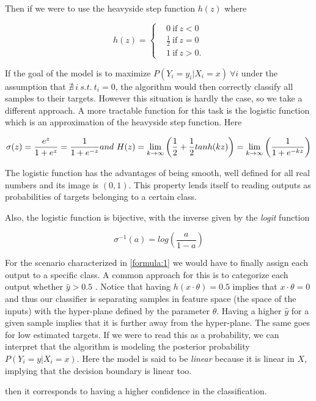 Then if we were to use the heavyside step function $h(z)$  where

\[
    h(z) =
      \begin{cases}
        &0 \ \mbox{if} \ z<0 \\
        &\frac{1}{2} \ \mbox{if} \  z=0 \\
        &1 \ \mbox{if} \  z>0.
      \end{cases}
    \]

If the goal of the model is to maximize $P(Y_i = y_i | X_i = x) \ \forall i$
under the assumption that $\nexists\  i \  s.t. \ t_i = 0$, the algorithm would then correctly classify all samples to their targets. However this situation is hardly the case, so we take a different approach. A more tractable function for this task is the logistic function which is an approximation of the heavyside step function. Here  

\begin{equation} \label{eq:logisticFunction}
\sigma(z)  = \frac{e^{z}}{1 + e^{z}} = \frac{1}{1 + e^{-z}}  \\
and \  H(z) = \lim_{k \to \infty} \left(\frac{1}{2} + \frac{1}{2}tanh(kz) \right) = \lim_{k \to \infty} \left(\frac{1}{1+e^{-kz}} \right)  
\end{equation}

The logistic function has the advantages of being smooth, well defined for all real numbers and its image is $(0,1)$. This property lends itself to reading outputs as probabilities of targets belonging to a certain class. 

Also, the logistic function is bijective, with the inverse given by the \textit{logit} function 

\begin{equation} \label{eq:logitFunction}
\sigma^{-1}(a)  = log( \frac{a}{1 -a})    
\end{equation}

For the scenario characterized in \ref{formula:1} we would have to finally assign each output to a specific class. A common approach for this is to categorize each output whether $\hat{y} > 0.5$ \label{formula:logitThreshold}. Notice that having $h(x \cdot \theta) = 0.5$ implies that $x \cdot  \theta = 0$ and thus our classifier is separating samples in feature space (the space of the inputs) with the hyper-plane defined by the parameter $\theta$. Having a higher $\hat{y}$ for a given sample implies that it is further away from the hyper-plane. The same goes for low estimated targets. If we were to read this as a probability, we can interpret that the algorithm is modeling the posterior probability $P(Y_i = y | X_i = x)$. Here the model is said to be \textit{linear} because it is linear in $X$, implying that the decision boundary is linear too. 



then it corresponds to having a higher confidence in the classification.


